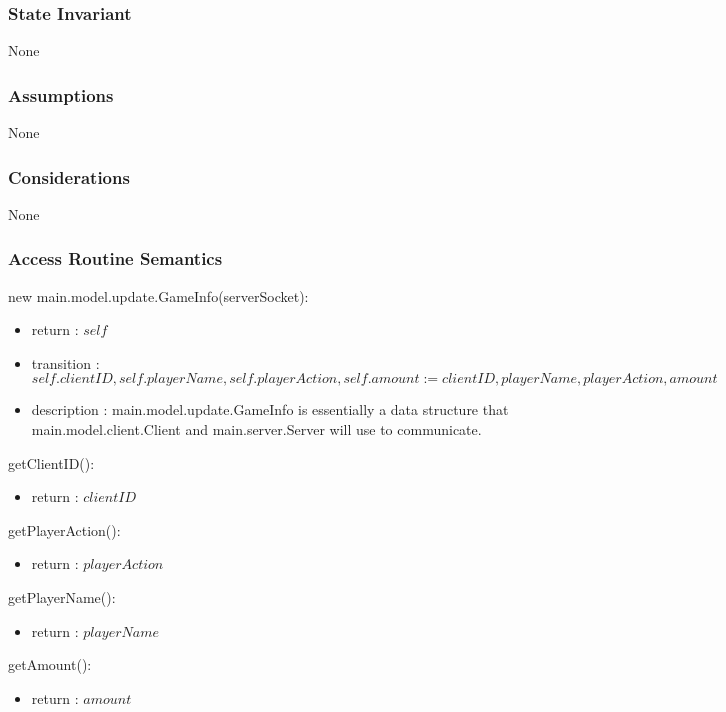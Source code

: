 \documentclass[12pt, titlepage]{article}
\begin{document}
    \subsubsection* {State Invariant}
        None
    
    \subsubsection* {Assumptions}
        None
    
    \subsubsection* {Considerations}
        None
    
    \subsubsection* {Access Routine Semantics}
    
        \noindent new main.model.update.GameInfo(serverSocket):
        \begin{itemize}
        \item return : $self$
        \item transition : $self.clientID, self.playerName, self.playerAction, self.amount := clientID, playerName, playerAction, amount$
        \item description : main.model.update.GameInfo is essentially a data structure that main.model.client.Client and main.server.Server will use to communicate.
        \end{itemize}
        
        \noindent getClientID():
        \begin{itemize}
        \item return : $clientID$
        \end{itemize}
        
        \noindent getPlayerAction():
        \begin{itemize}
        \item return : $playerAction$
        \end{itemize}
        
        \noindent getPlayerName():
        \begin{itemize}
        \item return : $playerName$
        \end{itemize}
        
        \noindent getAmount():
        \begin{itemize}
        \item return : $amount$
        \end{itemize}
        
\end{document}
